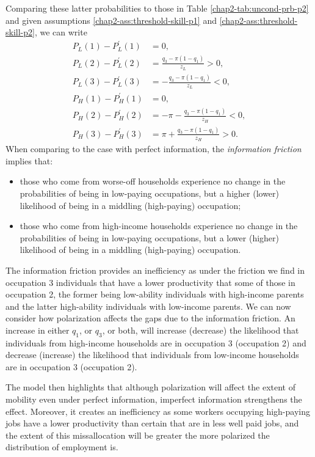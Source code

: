 Comparing these latter probabilities to those in Table \ref{chap2-tab:uncond-prb-p2} and given assumptions \ref{chap2-ass:threshold-skill-p1} and \ref{chap2-ass:threshold-skill-p2}, we can write
\begin{align*}
    P_L(1)-P_L^\prime(1) &= 0, \\
    P_L(2)-P_L^\prime(2) &=\frac{q_{3}-\pi
    (1-q_{1})}{z_{L}}>0, \\
    P_L(3)-P_L^\prime(3) &= -\frac{q_{3}-\pi
    (1-q_{1})}{z_{L}}<0, \\
    P_H(1)-P_H^\prime(1) &= 0, \\
    P_H(2)-P_H^\prime(2) &= -\pi -\frac{q_{3}-\pi(1-q_{1})}{z_{H}}<0, \\
    P_H(3)-P_H^\prime(3) &= \pi +\frac{q_{3}-\pi (1-q_{1})}{z_{H}}>0.
\end{align*}
When comparing to the case with perfect information, the \textit{information friction} implies that:
\begin{itemize}
    \item those who come from worse-off households experience no change in the probabilities of being in low-paying occupations, but a higher (lower) likelihood of being in a middling (high-paying) occupation;
    \item those who come from high-income households experience no change in the probabilities of being in low-paying occupations, but a lower (higher) likelihood of being in a middling (high-paying) occupation.
\end{itemize}
The information friction provides an inefficiency as under the friction we find in occupation 3 individuals that have a lower productivity that some of those in occupation 2, the former being low-ability individuals with high-income parents and the latter high-ability individuals with low-income parents. We can now consider how polarization affects the gaps due to the information friction. An increase in either $q_{1}$, or $q_{3}$, or both, will increase (decrease) the likelihood that individuals from high-income households are in occupation 3 (occupation 2) and decrease (increase) the likelihood that individuals from low-income households are in occupation 3 (occupation 2).

The model then highlights that although polarization will affect the extent of mobility even under perfect information, imperfect information strengthens the effect. Moreover, it creates an inefficiency as some workers occupying high-paying jobs have a lower productivity than certain that are in less well paid jobs, and the extent of this missallocation will be greater the more polarized the distribution of employment is.